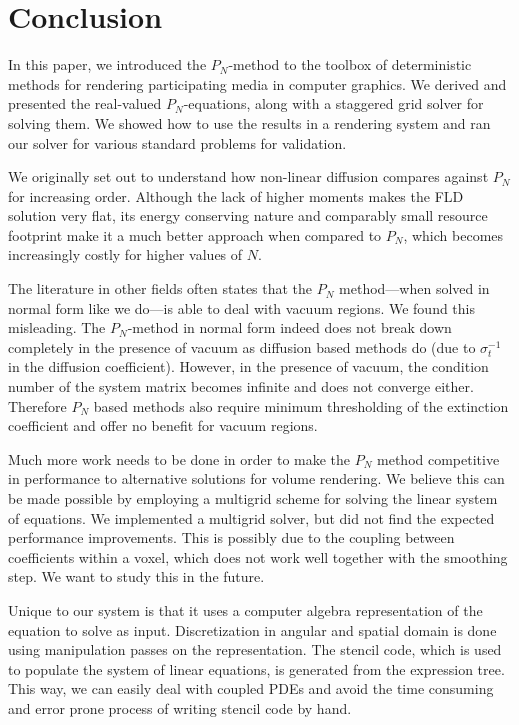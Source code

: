 \section{Conclusion}
\label{sec:conclusion}

In this paper, we introduced the $P_N$-method to the toolbox of deterministic methods for rendering participating media in computer graphics. We derived and presented the real-valued $P_N$-equations, along with a staggered grid solver for solving them. We showed how to use the results in a rendering system and ran our solver for various standard problems for validation.

We originally set out to understand how non-linear diffusion compares against $P_N$ for increasing order. Although the lack of higher moments makes the FLD solution very flat, its energy conserving nature and comparably small resource footprint make it a much better approach when compared to $P_N$, which becomes increasingly costly for higher values of $N$.

\vspace{0.5in}

The literature in other fields often states that the $P_N$ method---when solved in normal form like we do---is able to deal with vacuum regions. We found this misleading. The $P_N$-method in normal form indeed does not break down completely in the presence of vacuum as diffusion based methods do (due to $\sigma_t^{-1}$ in the diffusion coefficient). However, in the presence of vacuum, the condition number of the system matrix becomes infinite and does not converge either. Therefore $P_N$ based methods also require minimum thresholding of the extinction coefficient and offer no benefit for vacuum regions.

Much more work needs to be done in order to make the $P_N$ method competitive in performance to alternative solutions for volume rendering. We believe this can be made possible by employing a multigrid scheme for solving the linear system of equations. We implemented a multigrid solver, but did not find the expected performance improvements. This is possibly due to the coupling between coefficients within a voxel, which does not work well together with the smoothing step. We want to study this in the future.

Unique to our system is that it uses a computer algebra representation of the equation to solve as input. Discretization in angular and spatial domain is done using manipulation passes on the representation. The stencil code, which is used to populate the system of linear equations, is generated from the expression tree. This way, we can easily deal with coupled PDEs and avoid the time consuming and error prone process of writing stencil code by hand.

